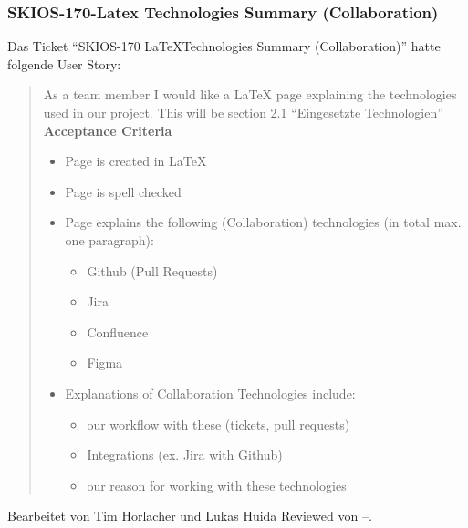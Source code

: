 \subsubsection{SKIOS-170-Latex Technologies Summary (Collaboration)}
Das Ticket \enquote{SKIOS-170 \LaTeX Technologies Summary (Collaboration)} hatte folgende User Story:
\begin{quotation}
    As a team member I would like a LaTeX page explaining the technologies used in our project.
    This will be section 2.1 “Eingesetzte Technologien”
\textbf{Acceptance Criteria}
\begin{itemize}
    \item Page is created in LaTeX
    \item Page is spell checked
    \item Page explains the following (Collaboration) technologies (in total max. one paragraph):
    \begin{itemize}
        \item Github (Pull Requests)
        \item Jira
        \item Confluence
        \item Figma
    \end{itemize}
    \item Explanations of Collaboration Technologies include:
    \begin{itemize}
        \item our workflow with these (tickets, pull requests)
        \item Integrations (ex. Jira with Github)
        \item our reason for working with these technologies
    \end{itemize}
\end{itemize}
\end{quotation}
Bearbeitet von Tim Horlacher und Lukas Huida
Reviewed von --.
